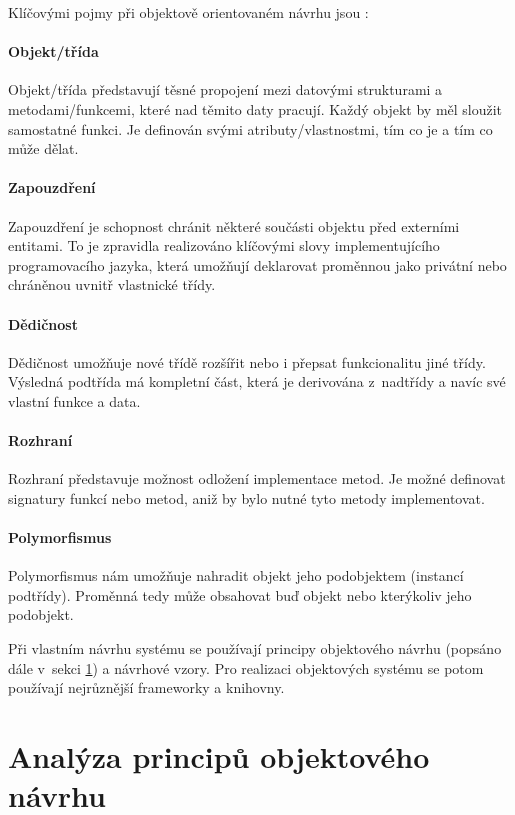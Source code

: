 Klíčovými pojmy při objektově orientovaném návrhu jsou \cite{wiki:oop_design}:

\paragraph{Objekt/třída}  Objekt/třída představují těsné propojení mezi datovými strukturami a metodami/funkcemi, které nad těmito daty pracují. Každý objekt by měl sloužit samostatné funkci. Je definován svými atributy/vlastnostmi, tím co je a tím co může dělat.
\paragraph{Zapouzdření} Zapouzdření je schopnost chránit některé součásti objektu před externími entitami. To je zpravidla realizováno klíčovými slovy implementujícího programovacího jazyka, která umožňují deklarovat proměnnou jako privátní nebo chráněnou uvnitř vlastnické třídy.
\paragraph{Dědičnost} Dědičnost umožňuje nové třídě rozšířit nebo i přepsat funkcionalitu jiné třídy. Výsledná podtřída má kompletní část, která je derivována z~nadtřídy a navíc své vlastní funkce a data.
\paragraph{Rozhraní} Rozhraní představuje možnost odložení implementace metod. Je možné definovat signatury funkcí nebo metod, aniž by bylo nutné tyto metody implementovat.
\paragraph{Polymorfismus} Polymorfismus nám umožňuje nahradit objekt jeho podobjektem (instancí podtřídy). Proměnná tedy může obsahovat buď objekt nebo kterýkoliv jeho podobjekt.

Při vlastním návrhu systému se používají principy objektového návrhu (popsáno dále v~sekci \ref{analysis-oop_design_principles}) a návrhové vzory. Pro realizaci objektových systému se potom používají nejrůznější frameworky a knihovny.

\section{Analýza principů objektového návrhu}
\label{analysis-oop_design_principles}

